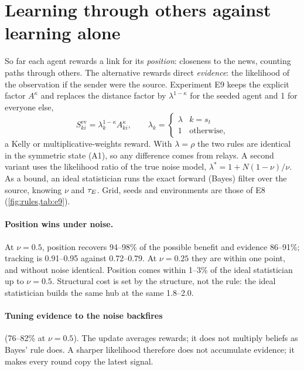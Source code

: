 \section{Learning through others against learning alone}\label{sec:learning}

So far each agent rewards a link for its \emph{position}: closeness to the news, counting paths through others. The
alternative rewards direct \emph{evidence}: the likelihood of the observation if the sender were the source. Experiment
E9 keeps the explicit factor $A^\kappa$ and replaces the distance factor by $\lambda^{1-\kappa}$ for the seeded agent and
1 for everyone else,
\begin{equation}
  S^{\mathrm{ev}}_{ki}=\lambda_k^{1-\kappa}A_{ki}^\kappa,\qquad \lambda_k=\begin{cases}\lambda & k=s_t\\ 1&\text{otherwise,}\end{cases}
\end{equation}
a Kelly or multiplicative-weights reward. With $\lambda=\rho$ the two rules are identical in the symmetric state (A1), so
any difference comes from relays. A second variant uses the likelihood ratio of the true noise model,
$\lambda^*=1+N(1-\nu)/\nu$. As a bound, an ideal statistician runs the exact forward (Bayes) filter over the source,
knowing $\nu$ and $\tau_E$. Grid, seeds and environments are those of E8 (\cref{fig:rules,tab:e9}).



\paragraph{Position wins under noise.} At $\nu=0.5$, position recovers 94--98\% of the possible benefit and evidence
86--91\%; tracking is 0.91--0.95 against 0.72--0.79. At $\nu=0.25$ they are within one point, and without noise
identical. Position comes within 1--3\% of the ideal statistician up to $\nu=0.5$. Structural cost is set by the structure,
not the rule: the ideal statistician builds the same hub at the same 1.8--2.0.

\paragraph{Tuning evidence to the noise backfires} (76--82\% at $\nu=0.5$). The update averages rewards; it does not
multiply beliefs as Bayes' rule does. A sharper likelihood therefore does not accumulate evidence; it makes every round
copy the latest signal.

